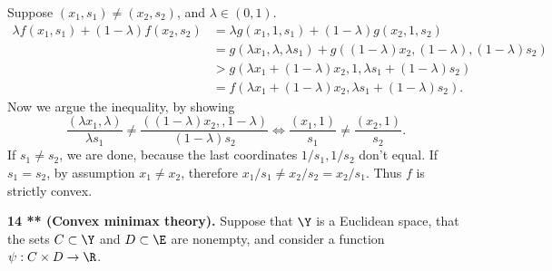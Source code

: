 \documentclass[../borwein-lewis_notes.tex]{subfiles}
\begin{document}
\begin{enumerate}[(a)]
{Suppose $(x_1,s_1)\neq (x_2,s_2)$, and $\lambda\in(0,1)$.
\begin{align*}
\lambda f(x_1, s_1) + (1-\lambda)f(x_2, s_2) &= \lambda g(x_1, 1, s_1)
+ (1-\lambda)g(x_2,1,s_2) \\
&= g(\lambda x_1, \lambda, \lambda s_1) + g((1-\lambda)x_2, (1-\lambda),
(1-\lambda)s_2) \\
&> g(\lambda x_1 + (1-\lambda)x_2, 1, \lambda s_1 + (1-\lambda)s_2)\\
&= f(\lambda x_1 + (1-\lambda)x_2, \lambda s_1 + (1-\lambda)s_2).
\end{align*}
Now we argue the inequality, by showing 
\begin{equation*}
\frac{(\lambda x_1, \lambda)}{\lambda s_1} \neq \frac{((1-\lambda)x_2,
,1-\lambda)}{(1-\lambda)s_2}
\iff \frac{(x_1,1)}{s_1} \neq \frac{(x_2,1)}{s_2}.
\end{equation*}
If $s_1\neq s_2$, we are done, because the last coordinates 
$1/s_1,1/s_2$ don't equal. If $s_1=s_2$, by assumption 
$x_1\neq x_2$, therefore $x_1/s_1 \neq x_2/s_2=x_2/s_1$. Thus $f$ is 
strictly convex.
}
\end{enumerate}
\textbf{14 ** (Convex minimax theory).} Suppose that $\Y$ is a Euclidean 
space, that the sets $C\subset\Y$ and $D\subset\E$ are nonempty, and 
consider a function $\psi:C\times D\to\R$.
\end{document}
